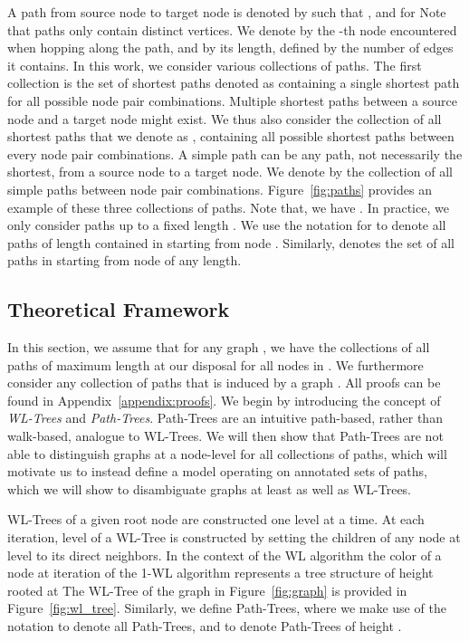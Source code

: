 \documentclass{article}
\theoremstyle{plain}
\theoremstyle{definition}
\theoremstyle{remark}
\begin{document}
A path from source node  to target node  is denoted by  such that ,  and  for  Note that paths only contain distinct vertices.  We denote by  the -th node encountered when hopping along the path, and by  its length, defined by the number of edges it contains. In this work, we consider various collections of paths. The first collection is the set of shortest paths denoted as  containing a single shortest path for all possible node pair combinations. Multiple shortest paths between a source node and a target node might exist. We thus also consider the collection of all shortest paths that we denote as , containing all possible shortest paths between every node pair combinations. 
A simple path can be any path, not necessarily the shortest, from a source node to a target node. We denote by  the collection of all simple paths between node pair combinations. 
Figure~\ref{fig:paths} provides an example of these three collections of paths. Note that, we have . In practice, we only consider paths up to a fixed length . We use the notation  for  to denote all paths of length  contained in  starting from node . Similarly,  denotes the set of all paths in  starting from node  of any length.

\subsection{Theoretical Framework}
\label{sec:theory}
In this section, we assume that for any graph , we have the collections of all paths of maximum length  at our disposal for all nodes in . We furthermore consider any collection of paths  that is induced by a graph .
All proofs can be found in Appendix~\ref{appendix:proofs}.
We begin by introducing the concept of \textit{WL-Trees} and \textit{Path-Trees}. 
Path-Trees are an intuitive path-based, rather than walk-based, analogue to WL-Trees. 
We will then show that Path-Trees are not able to distinguish graphs at a node-level for all collections of paths, which will motivate us to instead define a model operating on annotated sets of paths, which we will show to disambiguate graphs at least as well as WL-Trees. 

WL-Trees of a given root node are constructed one level at a time. 
At each iteration, level  of a WL-Tree is constructed by setting the children of any node at level  to its direct neighbors.
In the context of the WL algorithm the color of a node  at iteration  of the 1-WL algorithm represents a tree structure of height  rooted at 
The WL-Tree of the graph in Figure~\ref{fig:graph} is provided in Figure~\ref{fig:wl_tree}.
Similarly, we define Path-Trees, where we make use of the notation  to denote all Path-Trees, and  to denote Path-Trees of height . 
\end{document}
